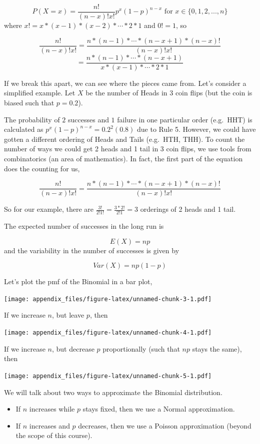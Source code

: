 \documentclass[
]{book}
\providecommand{\tightlist}{%
  \setlength{\itemsep}{0pt}\setlength{\parskip}{0pt}}
\begin{document}
\[P(X = x) =\frac{n!}{(n-x)! x!} p^x (1-p)^{n-x}\text{ for } x\in\{0,1,2,...,n\}\]
where \(x! = x*(x-1)*(x-2)*\cdots*2*1\) and \(0! = 1\), so

\[\frac{n!}{(n-x)! x!} = \frac{n*(n-1)*\cdots*(n-x+1)*(n-x)!}{(n-x)! x!}\]
\[= \frac{n*(n-1)*\cdots*(n-x+1)}{x*(x-1)*\cdots*2*1}\]

If we break this apart, we can see where the pieces came from. Let's consider a simplified example. Let \(X\) be the number of Heads in 3 coin flips (but the coin is biased such that \(p=0.2\)).

The probability of \(2\) successes and \(1\) failure in one particular order (e.g.~HHT) is calculated as \(p^x (1-p)^{n-x} = 0.2^2(0.8)\) due to Rule 5. However, we could have gotten a different ordering of Heads and Tails (e.g.~HTH, THH). To count the number of ways we could get 2 heads and 1 tail in 3 coin flips, we use tools from combinatorics (an area of mathematics). In fact, the first part of the equation does the counting for us,

\[\frac{n!}{(n-x)! x!} = \frac{n*(n-1)*\cdots*(n-x+1)*(n-x)!}{(n-x)! x!}\]

So for our example, there are \(\frac{3!}{2!1!} = \frac{3*2!}{2!1} = 3\) orderings of 2 heads and 1 tail.

The expected number of successes in the long run is

\[E(X) = np\]
and the variability in the number of successes is given by

\[Var(X) = np(1-p) \]

Let's plot the pmf of the Binomial in a bar plot,

\texttt{[image: appendix\_files/figure-latex/unnamed-chunk-3-1.pdf]}

If we increase \(n\), but leave \(p\), then

\texttt{[image: appendix\_files/figure-latex/unnamed-chunk-4-1.pdf]}

If we increase \(n\), but decrease \(p\) proportionally (such that \(np\) stays the same), then

\texttt{[image: appendix\_files/figure-latex/unnamed-chunk-5-1.pdf]}

We will talk about two ways to approximate the Binomial distribution.

\begin{itemize}
\tightlist
\item
  If \(n\) increases while \(p\) stays fixed, then we use a Normal approximation.
\item
  If \(n\) increases and \(p\) decreases, then we use a Poisson approximation (beyond the scope of this course).
\end{itemize}
\end{document}
